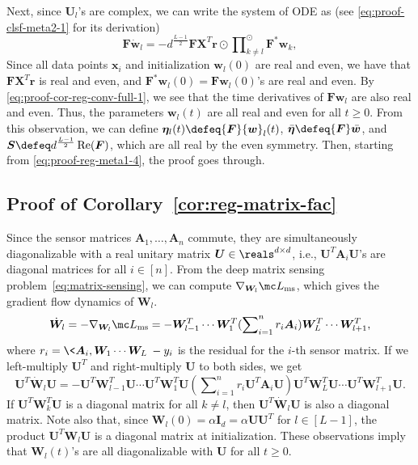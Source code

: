 \documentclass{article} %
\def\vr{{\bm{r}}}
\def\vw{{\bm{w}}}
\def\vx{{\bm{x}}}
\def\mA{{\bm{A}}}
\def\mF{{\bm{F}}}
\def\mI{{\bm{I}}}
\def\mS{{\bm{S}}}
\def\mU{{\bm{U}}}
\def\mW{{\bm{W}}}
\def\mX{{\bm{X}}}
\newcommand{\veta}{{\bm{\eta}}}
\renewcommand{\Re}{\mathop{\rm Re}}
\begin{document}
Next, since $\mU_l$'s are complex, we can write the system of ODE as (see \eqref{eq:proof-clsf-meta2-1} for its derivation)
\begin{equation}
\label{eq:proof-cor-reg-conv-full-1}
    \mF \dot \vw_l = - d^{\frac{L-1}{2}} \mF \mX^T \vr \odot \prod\nolimits_{k \neq l}^{\odot} \mF^* \vw_k,
\end{equation}
Since all data points $\vx_i$ and initialization $\vw_l(0)$ are real and even, we have that $\mF \mX^T \vr$ is real and even, and $\mF^* \vw_l(0) = \mF \vw_l(0)$'s are real and even. By \eqref{eq:proof-cor-reg-conv-full-1}, we see that the time derivatives of $\mF \vw_l$ are also real and even. Thus, the parameters $\vw_l(t)$ are all real and even for all $t \geq 0$.
From this observation, we can define
$\veta_l(t) \defeq \mF \vw_l(t)$, $\bar \veta \defeq \mF \bar \vw$, and $\mS \defeq d^{\frac{L-1}{2}} \Re(\mF)$, which are all real by the even symmetry.
Then, starting from \eqref{eq:proof-reg-meta1-4}, the proof goes through.


\subsection{Proof of Corollary~\ref{cor:reg-matrix-fac}}
Since the sensor matrices $\mA_1, \dots, \mA_n$ commute, they are simultaneously diagonalizable with a real unitary matrix $\mU \in \reals^{d \times d}$, i.e., $\mU^T \mA_i \mU$'s are diagonal matrices for all $i \in [n]$.
From the deep matrix sensing problem~\eqref{eq:matrix-sensing}, we can compute $\nabla_{\mW_l} \mc L_{\rm ms}$, which gives the gradient flow dynamics of $\mW_l$.
\begin{equation*}
    \dot \mW_l = -\nabla_{\mW_l} \mc L_{\rm ms}
    = - \mW_{l-1}^T \cdots \mW_1^T (\sum\nolimits_{i=1}^n r_i \mA_i) \mW_L^T \cdots \mW_{l+1}^T,
\end{equation*}
where $r_i = \< \mA_i, \mW_1\cdots \mW_L \> - y_i$ is the residual for the $i$-th sensor matrix.
If we left-multiply $\mU^T$ and right-multiply $\mU$ to both sides, we get
\begin{equation}
\label{eq:proof-cor-reg-matrix-fac-1}
    \mU^T \dot \mW_l \mU 
    = - \mU^T \mW_{l-1}^T \mU \cdots \mU^T \mW_1^T \mU (\sum\nolimits_{i=1}^n r_i \mU^T \mA_i \mU) \mU^T \mW_L^T \mU \cdots \mU^T \mW_{l+1}^T \mU.
\end{equation}
If $\mU^T \mW_{k}^T \mU$ is a diagonal matrix for all $k \neq l$, then $\mU^T \dot \mW_l \mU$ is also a diagonal matrix.
Note also that, since $\mW_l(0) = \alpha \mI_d = \alpha \mU \mU^T$ for $l \in [L-1]$, the product $\mU^T\mW_l\mU$ is a diagonal matrix at initialization. 
These observations imply that $\mW_l(t)$'s are all diagonalizable with $\mU$ for all $t \geq 0$.
\end{document}
